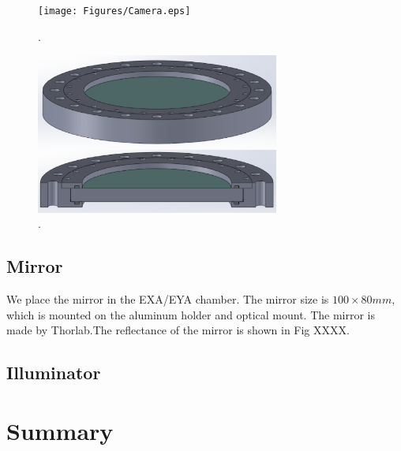 \begin{figure}
\begin{center}
\texttt{[image: Figures/Camera.eps]}
\caption{.} 
\label{fig:Camera} 
\end{center}
\end{figure}

\begin{figure}
\begin{center}
\includegraphics[width=8cm]{Figures/Camera_view_window.eps}
\caption{.} 
\label{fig:Camera_window} 
\end{center}
\end{figure}
\subsection{Mirror}
We place the mirror in the EXA/EYA chamber. The mirror size is $100 \times 80 mm$, which is mounted on the aluminum holder and optical mount. The mirror is made by Thorlab.The reflectance of the mirror is shown in Fig XXXX.
\subsection{Illuminator}

\section{Summary}
